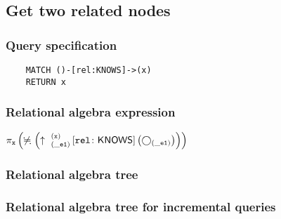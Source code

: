 	\subsection{Get two related nodes}

	\subsubsection*{Query specification}

	\begin{lstlisting}
	MATCH ()-[rel:KNOWS]->(x)
	RETURN x
	\end{lstlisting}


	\subsubsection*{Relational algebra expression}

	$\projection{\var{x}} \left(\alldifferent{} \left(\expandout{\_e1}{x}{}{rel}{KNOWS} \left(\getvertices{\_e1}{}\right)\right)\right)$

	\subsubsection*{Relational algebra tree}


	\subsubsection*{Relational algebra tree for incremental queries}

